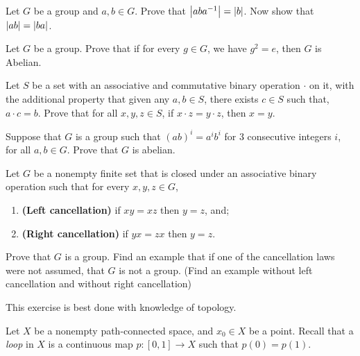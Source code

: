 \documentclass[./main.tex]{subfiles}
\begin{document}
\begin{prob}
    Let $G$ be a group and $a, b \in G$. Prove that $\abs{aba\inv} = \abs{b}$.
    Now show that $\abs{ab} = \abs{ba}$. 
\end{prob}

\begin{prob}
    Let $G$ be a group. Prove that if for every $g \in G$, we have $g^2 = e$,
    then $G$ is Abelian.
\end{prob}

\begin{prob}
    Let $S$ be a set with an associative and commutative binary operation
    $\cdot$ on it, with the additional property that given any $a, b \in S$,
    there exists $c \in S$ such that, $a \cdot c = b$. Prove that for all $x,y,z
    \in S$, if $x \cdot z = y \cdot z$, then $x = y$.
\end{prob}

\begin{prob}
    Suppose that $G$ is a group such that $(ab)^i = a^i b^i$ for 3 consecutive
    integers $i$, for all $a, b \in G$. Prove that $G$ is abelian.
\end{prob}

\begin{prob}
    Let $G$ be a nonempty finite set that is closed under an associative binary
    operation such that for every $x, y, z \in G$, 
    \begin{enumerate}
        \item \textbf{(Left cancellation)} if $xy = xz$ then $y = z$, and;
        \item \textbf{(Right cancellation)} if $yx = zx$ then $y =z$.
    \end{enumerate}
    Prove that $G$ is a group. Find an example that if one of the cancellation
    laws were not assumed, that $G$ is not a group. (Find an example without left cancellation and without right cancellation)
\end{prob}

\begin{prob}
    This exercise is best done with knowledge of topology. 

    Let $X$ be a nonempty path-connected space, and $x_0 \in X$ be a point.
    Recall that a \emph{loop} in $X$ is a continuous map $p: [0,1] \to X$ such
    that $p(0) = p(1)$. 
\end{prob}
\end{document}
